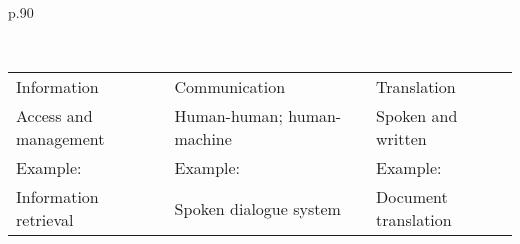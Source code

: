 {\begin{tabular}{p{.90\linewidth}}
   \vspace{.15cm}\centerline{{\textcolor{white}{\Large  What are the major topics?}}}
  \center
  \begin{tabular}{p{.30\linewidth} p{.30\linewidth}p{.30\linewidth}}
  \rowcolor{yellow} \vspace{.001cm} {\Large Information} & \vspace{.001cm} {\Large Communication} & \vspace{.001cm}  {\Large Translation} \\[-1.2mm]
  \rowcolor{yellow} \small Access and management & \small Human-human; human-machine & \small Spoken and written \\[.4em]
  \rowcolor{yellow} Example: & Example: & Example: \\[-1.2mm]
  \rowcolor{yellow} Information retrieval & Spoken dialogue system & Document translation\\[2mm]
  \end{tabular}
  \vspace*{2mm} \\

  \end{tabular}
}
